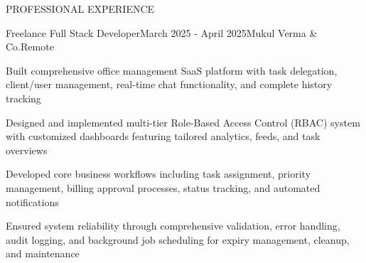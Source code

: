 \documentclass{resume}
\begin{document}
\begin{rSection}{PROFESSIONAL EXPERIENCE}

\begin{rExperience}{Freelance Full Stack Developer}{March 2025 - April 2025}{Mukul Verma \& Co.}{Remote}
\item Built comprehensive office management SaaS platform with task delegation, client/user management, real-time chat functionality, and complete history tracking
\item Designed and implemented multi-tier Role-Based Access Control (RBAC) system with customized dashboards featuring tailored analytics, feeds, and task overviews
\item Developed core business workflows including task assignment, priority management, billing approval processes, status tracking, and automated notifications
\item Ensured system reliability through comprehensive validation, error handling, audit logging, and background job scheduling for expiry management, cleanup, and maintenance
\end{rExperience}

\end{rSection}
\end{document}
